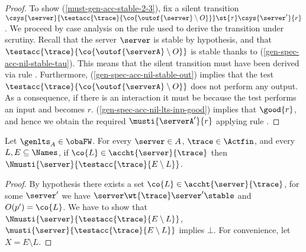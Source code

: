 {\begin{proof}
To show (\ref{must-gen-acc-stable-2-3}), fix a silent transition
$\csys{\server}{\testacc{\trace}{\co{ \outof{\server} \setminus O}}} \st{\tau} \csys{\server'}{r}$.
We proceed by case analysis on the rule used to derive the
transition under scrutiny.
Recall that the server $\server$ is stable by hypothesis, and that
$\testacc{\trace}{\co{ \outof{\serverA} \setminus O }}$ is stable
thanks to
(\ref{gen-spec-acc-nil-stable-tau}).
This means that the silent transition must have been derived via rule \scom.
Furthermore, (\ref{gen-spec-acc-nil-stable-out}) implies that the test
$\testacc{\trace}{\co{ \outof{\serverA} \setminus O }}$ does not perform any output.
As a consequence, if there is an interaction it must be because the test
performs an input and becomes $r$.
(\ref{gen-spec-acc-nil-lts-inp-good})
implies that $\good{r}$, and hence we obtain the required
$\musti{\serverA'}{r}$ applying rule \mnow.
\end{proof}



\noindent%
\textbf{}
Let $\genlts_A \in \obaFW$.
  For every $\server \in \States$, $\trace \in \Actfin$,
  and every $L, E \subseteq \Names$, if
  $\co{L} \in \accht{ \server }{ \trace }$
  then $\Nmusti{ \server }{ \testacc{\trace}{E \setminus L}}$.
\begin{proof}%
  By hypothesis there exists a set $\co{ L } \in \accht{ \server }{ \trace }$,
  \ie for some $\server'$ we have $\server \wt{ \trace } \server' \stable$ and $O(p') = \co{L}$.
  We have to show that $\Nmusti{ \server }{\testacc{ \trace }{E \setminus L}}$, \ie
  $\musti{ \server }{\testacc{ \trace }{E \setminus L}}$ implies $\bot$.
  For convenience, let $X = E \setminus L$.




\end{proof}}
